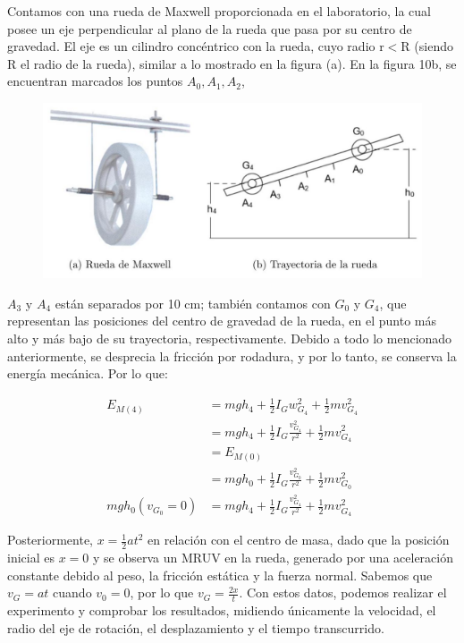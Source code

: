 \documentclass[10pt]{article}
\begin{document}
Contamos con una rueda de Maxwell proporcionada en el laboratorio, la cual posee un eje perpendicular al plano de la rueda que pasa por su centro de gravedad. El eje es un cilindro concéntrico con la rueda, cuyo radio $\mathrm{r} < \mathrm{R}$ (siendo $\mathrm{R}$ el radio de la rueda), similar a lo mostrado en la figura (a). En la figura 10b, se encuentran marcados los puntos $A_{0}, A_{1}, A_{2}$,
\begin{figure}[H]
    \centering
\includegraphics[scale = 0.30, center]{2025_04_01_ea720b93e8ebb5d0c6aeg-09(1)}
\end{figure}

$A_{3}$ y $A_{4}$ están separados por 10 cm; también contamos con $G_{0}$ y $G_{4}$, que representan las posiciones del centro de gravedad de la rueda, en el punto más alto y más bajo de su trayectoria, respectivamente. Debido a todo lo mencionado anteriormente, se desprecia la fricción por rodadura, y por lo tanto, se conserva la energía mecánica. Por lo que:

\begin{align*}
E_{M(4)} & =m g h_{4}+\frac{1}{2} I_{G} w_{G_{4}}^{2}+\frac{1}{2} m v_{G_{4}}^{2}  \tag{6}\\
& =m g h_{4}+\frac{1}{2} I_{G} \frac{v_{G_{4}}^{2}}{r^{2}}+\frac{1}{2} m v_{G_{4}}^{2}  \tag{7}\\
& =E_{M(0)}  \tag{8}\\
& =m g h_{0}+\frac{1}{2} I_{G} \frac{v_{G_{0}}^{2}}{r^{2}}+\frac{1}{2} m v_{G_{0}}^{2}  \tag{9}\\
m g h_{0}\left(v_{G_{0}}=0\right) & =m g h_{4}+\frac{1}{2} I_{G} \frac{v_{G_{4}}^{2}}{r^{2}}+\frac{1}{2} m v_{G_{4}}^{2} \tag{10}
\end{align*}

Posteriormente, $x = \frac{1}{2} a t^{2}$ en relación con el centro de masa, dado que la posición inicial es $x = 0$ y se observa un MRUV en la rueda, generado por una aceleración constante debido al peso, la fricción estática y la fuerza normal. Sabemos que $v_{G} = a t$ cuando $v_{0} = 0$, por lo que $v_{G} = \frac{2 x}{t}$. Con estos datos, podemos realizar el experimento y comprobar los resultados, midiendo únicamente la velocidad, el radio del eje de rotación, el desplazamiento y el tiempo transcurrido.
\end{document}
